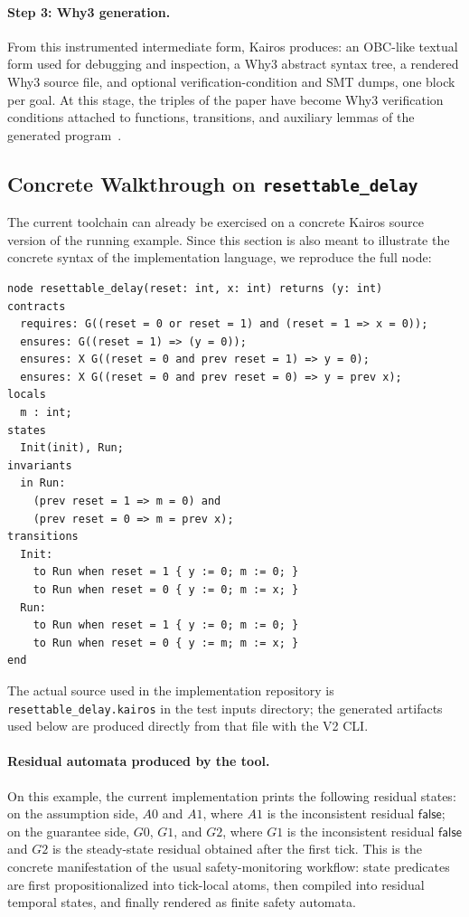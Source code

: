 \documentclass[11pt,a4paper]{article}
\newcommand{\False}{\mathsf{false}}
\begin{document}
\paragraph{Step 3: Why3 generation.}
From this instrumented intermediate form, Kairos produces:
an OBC-like textual form used for debugging and inspection, a Why3 abstract
syntax tree, a rendered Why3 source file, and optional verification-condition
and SMT dumps, one block per goal.
At this stage, the triples of the paper have become Why3 verification
conditions attached to functions, transitions, and auxiliary lemmas of the
generated program~\cite{why3}.

\subsection{Concrete Walkthrough on \texttt{resettable\_delay}}

The current toolchain can already be exercised on a concrete Kairos source
version of the running example. Since this section is also meant to illustrate
the concrete syntax of the implementation language, we reproduce the full node:
\begin{verbatim}
node resettable_delay(reset: int, x: int) returns (y: int)
contracts
  requires: G((reset = 0 or reset = 1) and (reset = 1 => x = 0));
  ensures: G((reset = 1) => (y = 0));
  ensures: X G((reset = 0 and prev reset = 1) => y = 0);
  ensures: X G((reset = 0 and prev reset = 0) => y = prev x);
locals
  m : int;
states
  Init(init), Run;
invariants
  in Run:
    (prev reset = 1 => m = 0) and
    (prev reset = 0 => m = prev x);
transitions
  Init:
    to Run when reset = 1 { y := 0; m := 0; }
    to Run when reset = 0 { y := 0; m := x; }
  Run:
    to Run when reset = 1 { y := 0; m := 0; }
    to Run when reset = 0 { y := m; m := x; }
end
\end{verbatim}
The actual source used in the implementation repository is
\texttt{resettable\_delay.kairos} in the test inputs directory; the generated
artifacts used below are produced directly from that file with the V2 CLI.

\paragraph{Residual automata produced by the tool.}
On this example, the current implementation prints the following residual
states: on the assumption side, \(A0\) and \(A1\), where \(A1\) is the
inconsistent residual \(\False\); on the guarantee side, \(G0\), \(G1\), and
\(G2\), where \(G1\) is the inconsistent residual \(\False\) and \(G2\) is
the steady-state residual obtained after the first tick.
This is the concrete manifestation of the usual safety-monitoring workflow:
state predicates are first propositionalized into tick-local atoms, then
compiled into residual temporal states, and finally rendered as finite safety
automata.
\end{document}
